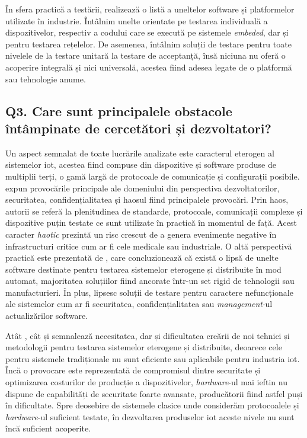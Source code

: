 În sfera practică a testării, \citet{Dias2018} realizează o listă a uneltelor software și platformelor utilizate în industrie. Întâlnim unelte orientate pe testarea individuală a dispozitivelor, respectiv a codului care se execută pe sistemele \textit{embeded}, dar și pentru testarea rețelelor. De asemenea, întâlnim soluții de testare pentru toate nivelele de la testare unitară la testare de acceptanță, însă niciuna nu oferă o acoperire integrală și nici universală, acestea fiind adesea legate de o platformă sau tehnologie anume. %

\subsection*{Q3. Care sunt principalele obstacole întâmpinate de cercetători și dezvoltatori?}

Un aspect semnalat de toate lucrările analizate este caracterul eterogen al sistemelor \acrshort{iot}, acestea fiind compuse din dispozitive și software produse de multiplii terți, o gamă largă de protocoale de comunicație și configurații posibile. \citet{Lee2015} expun provocările principale ale domeniului din perspectiva dezvoltatorilor, securitatea, confidențialitatea și haosul fiind principalele provocări. Prin haos, autorii se referă la plenitudinea de standarde, protocoale, comunicații complexe și dispozitive puțin testate ce sunt utilizate în practică în momentul de față. Acest caracter \textit{haotic} prezintă un risc crescut de a genera evenimente negative în infrastructuri critice cum ar fi cele medicale sau industriale. O altă perspectivă practică este prezentată de \citet{Dias2018}, care concluzionează că există o lipsă de unelte software destinate pentru testarea sistemelor eterogene și distribuite în mod automat, majoritatea soluțiilor fiind ancorate într-un set rigid de tehnologii sau manufacturieri. În plus, lipsesc soluții de testare pentru caractere nefuncționale ale sistemelor cum ar fi securitatea, confidențialitatea sau \textit{management}-ul actualizărilor software.

Atât \citet{Corts2019}, cât și \citet{Ahmed2019} semnalează necesitatea, dar și dificultatea creării de noi tehnici și metodologii pentru testarea sistemelor eterogene și distribuite, deoarece cele pentru sistemele tradiționale nu sunt eficiente sau aplicabile pentru industria \acrshort{iot}. Încă o provocare este reprezentată de compromisul dintre securitate și optimizarea costurilor de producție a dispozitivelor, \textit{hardware}-ul mai ieftin nu dispune de capabilități de securitate foarte avansate, producătorii fiind astfel puși în dificultate. Spre deosebire de sistemele clasice unde considerăm protocoalele și \textit{hardware}-ul suficient testate, în dezvoltarea produselor \acrshort{iot} aceste nivele nu sunt încă suficient acoperite.

